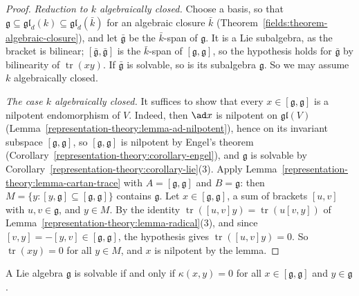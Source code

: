 \begin{proof}
\emph{Reduction to $k$ algebraically closed.} Choose a basis, so that $\mathfrak{g} \subseteq \mathfrak{gl}_d(k) \subseteq \mathfrak{gl}_d(\bar k)$ for an algebraic closure
$\bar k$ (Theorem~\ref{fields:theorem-algebraic-closure}), and let $\bar{\mathfrak{g}}$ be the $\bar k$-span of $\mathfrak{g}$. It is a Lie subalgebra, as the bracket is
bilinear; $[\bar{\mathfrak{g}}, \bar{\mathfrak{g}}]$ is the $\bar k$-span of $[\mathfrak{g}, \mathfrak{g}]$, so the hypothesis holds for $\bar{\mathfrak{g}}$ by bilinearity of
$\operatorname{tr}(xy)$. If $\bar{\mathfrak{g}}$ is solvable, so is its subalgebra $\mathfrak{g}$. So we may assume $k$ algebraically closed.

\emph{The case $k$ algebraically closed.} It suffices to show that every $x \in [\mathfrak{g}, \mathfrak{g}]$ is a nilpotent endomorphism of $V$. Indeed, then $\ad x$ is
nilpotent on $\mathfrak{gl}(V)$ (Lemma~\ref{representation-theory:lemma-ad-nilpotent}), hence on its invariant subspace $[\mathfrak{g}, \mathfrak{g}]$, so
$[\mathfrak{g}, \mathfrak{g}]$ is nilpotent by Engel's theorem (Corollary~\ref{representation-theory:corollary-engel}), and $\mathfrak{g}$ is solvable by
Corollary~\ref{representation-theory:corollary-lie}(3). Apply Lemma~\ref{representation-theory:lemma-cartan-trace} with $A = [\mathfrak{g}, \mathfrak{g}]$ and $B = \mathfrak{g}$:
then $M = \{y : [y, \mathfrak{g}] \subseteq [\mathfrak{g}, \mathfrak{g}]\}$ contains $\mathfrak{g}$. Let $x \in [\mathfrak{g}, \mathfrak{g}]$, a sum of brackets $[u, v]$ with
$u, v \in \mathfrak{g}$, and $y \in M$. By the identity $\operatorname{tr}([u, v]y) = \operatorname{tr}(u[v, y])$ of Lemma~\ref{representation-theory:lemma-radical}(3), and since
$[v, y] = -[y, v] \in [\mathfrak{g}, \mathfrak{g}]$, the hypothesis gives $\operatorname{tr}([u, v]y) = 0$. So $\operatorname{tr}(xy) = 0$ for all $y \in M$, and $x$ is nilpotent by
the lemma.
\end{proof}

\begin{corollary}\label{representation-theory:corollary-cartan-criterion}
A Lie algebra $\mathfrak{g}$ is solvable if and only if $\kappa(x, y) = 0$ for all $x \in [\mathfrak{g}, \mathfrak{g}]$ and $y \in \mathfrak{g}$.
\end{corollary}


